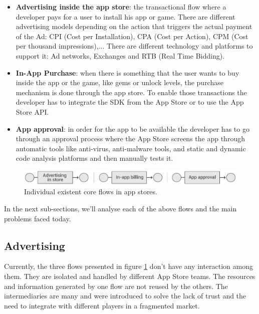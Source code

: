 \begin{itemize}
\item {\bf Advertising inside the app store}: the transactional flow where a developer pays for a user to install his app or game. There are different advertising models depending on the action that triggers the actual payment of the Ad: CPI (Cost per Installation), CPA (Cost per Action), CPM (Cost per thousand impressions),... There are different technology and platforms to support it: Ad networks, Exchanges and RTB (Real Time Bidding).
\item {\bf In-App Purchase}: when there is something that the user wants to buy inside the app or the game, like gems or unlock levels, the purchase mechanism is done through the app store. To enable those transactions the developer has to integrate the SDK from the App Store or to use the App Store API.
\item {\bf App approval}: in order for the app to be available the developer has to go through an approval process where the App Store screens the app through automatic tools like anti-virus, anti-malware tools, and static and dynamic code analysis platforms and then manually tests it.
\end{itemize}


\begin{figure}[!ht]
\centering
\includegraphics[width=\textwidth]{diagrams/current_flows.eps}
\caption{Individual existent core flows in app stores.}
\label{fig:exist_flows}
\end{figure}




In the next sub-sections, we'll analyse each of the above flows and the main problems faced today.

\subsection{Advertising}


Currently, the three flows presented in figure \ref{fig:exist_flows} don't have any interaction among them. They are isolated and handled by different App Store teams. The resources and information generated by one flow are not reused by the others. The intermediaries are many and were introduced to solve the lack of trust and the need to integrate with different players in a fragmented market.  

